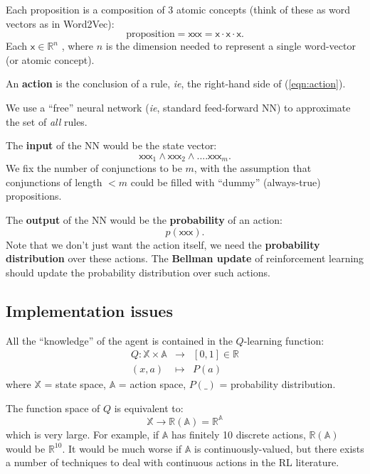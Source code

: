 \documentclass[orivec]{llncs}
\begin{document}
Each proposition is a composition of 3 atomic concepts (think of these as word vectors as in Word2Vec):
\begin{equation}
\mbox{proposition} = \mathsf{xxx} = \mathsf{x} \cdot \mathsf{x} \cdot \mathsf{x}.
\end{equation}
Each $\mathsf{x} \in \mathbb{R}^n$ , where $n$ is the dimension needed to represent a single word-vector (or atomic concept).

An \textbf{action} is the conclusion of a rule, \textit{ie}, the right-hand side of (\ref{eqn:action}).

We use a ``free'' neural network (\textit{ie}, standard feed-forward NN) to approximate the set of \textit{all} rules.

The \textbf{input} of the NN would be the state vector:
\begin{equation}
\mathsf{xxx}_1 \wedge \mathsf{xxx}_2 \wedge .... \mathsf{xxx}_m .
\end{equation}
We fix the number of conjunctions to be $m$, with the assumption that conjunctions of length $< m$ could be filled with ``dummy'' (always-true) propositions.

The \textbf{output} of the NN would be the \textbf{probability} of an action:
\begin{equation}
p(\mathsf{xxx}).
\end{equation}
Note that we don't just want the action itself, we need the \textbf{probability distribution} over these actions.  The \textbf{Bellman update} of reinforcement learning should update the probability distribution over such actions.

\subsection{Implementation issues}

All the ``knowledge'' of the agent is contained in the $Q$-learning function:
\begin{eqnarray}
Q: \mathbb{X} \times \mathbb{A} &\rightarrow& [0,1] \in \mathbb{R} \nonumber \\
(x,a) &\mapsto& P(a)
\end{eqnarray}
where $\mathbb{X}$ = state space, $\mathbb{A}$ = action space, $P(\_)$ = probability distribution.

The function space of $Q$ is equivalent to:
\begin{equation}
\mathbb{X} \rightarrow \mathbb{R} (\mathbb{A}) = \mathbb{R}^{\mathbb{A}}
\end{equation}
which is very large.  For example, if $\mathbb{A}$ has finitely 10 discrete actions, $\mathbb{R}(\mathbb{A})$ would be $\mathbb{R}^{10}$.  It would be much worse if $\mathbb{A}$ is continuously-valued, but there exists a number of techniques to deal with continuous actions in the RL literature.
\end{document}

